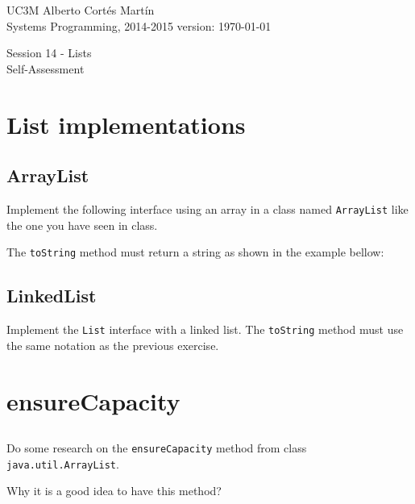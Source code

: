\documentclass[a4paper, 11pt]{article}
\newcommand{\realtitle}{Session 14 - Lists}
\begin{document}
\makebox[\linewidth]{\rule{\textwidth}{0.4pt}}
UC3M \hfill Alberto Cortés Martín\\
Systems Programming, 2014-2015 \hfill version: \today\\
\makebox[\linewidth]{\rule{\textwidth}{0.4pt}}
\begin{center}
  \Large{\realtitle}\\Self-Assessment
\end{center}
\makebox[\linewidth]{\rule{\textwidth}{0.4pt}}
\vspace{1cm}

\section{List implementations}

\subsection{ArrayList}

Implement the following interface using an array in a class named \verb+ArrayList+ like the one you have seen in class.


The \verb+toString+ method must return a string as shown in the example bellow:


\subsection{LinkedList}

Implement the \verb+List+ interface with a linked list. The \verb+toString+ method must use the same notation as the previous exercise.


\section{ensureCapacity}

\subsection{}

Do some research on the \verb+ensureCapacity+ method from class \verb+java.util.ArrayList+.

Why it is a good idea to have this method?
\end{document}
